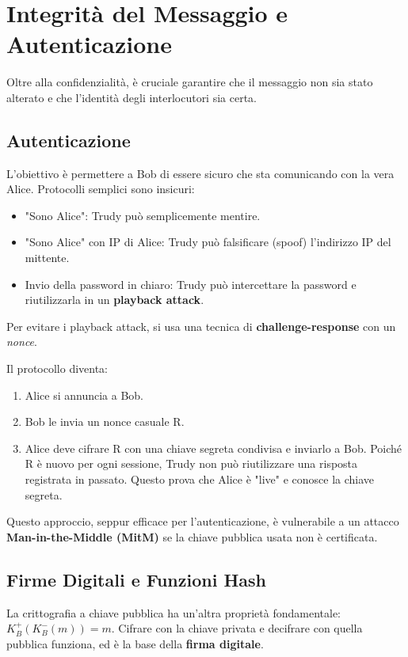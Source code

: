 \section{Integrità del Messaggio e Autenticazione}
Oltre alla confidenzialità, è cruciale garantire che il messaggio non sia stato alterato e che l'identità degli interlocutori sia certa.

\subsection{Autenticazione}
L'obiettivo è permettere a Bob di essere sicuro che sta comunicando con la vera Alice. Protocolli semplici sono insicuri:
\begin{itemize}
    \item "Sono Alice": Trudy può semplicemente mentire.
    \item "Sono Alice" con IP di Alice: Trudy può falsificare (spoof) l'indirizzo IP del mittente.
    \item Invio della password in chiaro: Trudy può intercettare la password e riutilizzarla in un \textbf{playback attack}.
\end{itemize}

Per evitare i playback attack, si usa una tecnica di \textbf{challenge-response} con un \textit{nonce}.


Il protocollo diventa:
\begin{enumerate}
    \item Alice si annuncia a Bob.
    \item Bob le invia un nonce casuale R.
    \item Alice deve cifrare R con una chiave segreta condivisa e inviarlo a Bob. Poiché R è nuovo per ogni sessione, Trudy non può riutilizzare una risposta registrata in passato. Questo prova che Alice è "live" e conosce la chiave segreta.
\end{enumerate}

Questo approccio, seppur efficace per l'autenticazione, è vulnerabile a un attacco \textbf{Man-in-the-Middle (MitM)} se la chiave pubblica usata non è certificata.

\subsection{Firme Digitali e Funzioni Hash}
La crittografia a chiave pubblica ha un'altra proprietà fondamentale: $K_B^{+}(K_B^{-}(m)) = m$. Cifrare con la chiave privata e decifrare con quella pubblica funziona, ed è la base della \textbf{firma digitale}.

